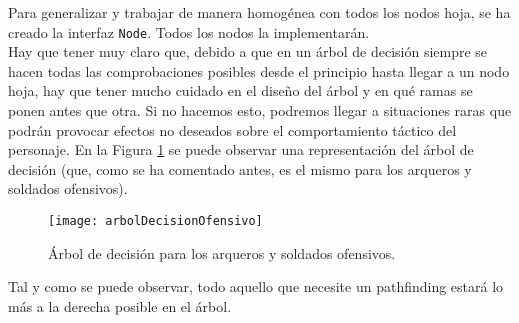 Para generalizar y trabajar de manera homogénea con todos los nodos hoja, se ha creado la interfaz \texttt{Node}. Todos los nodos la implementarán. \\

Hay que tener muy claro que, debido a que en un árbol de decisión siempre se hacen todas las comprobaciones posibles desde el principio hasta llegar a un nodo hoja, hay que tener mucho cuidado en el diseño del árbol y en qué ramas se ponen antes que otra. Si no hacemos esto, podremos llegar a situaciones raras que podrán provocar efectos no deseados sobre el comportamiento táctico del personaje. En la Figura \ref{ofensivos:ofensivos} se puede observar una representación del árbol de decisión (que, como se ha comentado antes, es el mismo para los arqueros y soldados ofensivos). \\

\begin{figure}[!th]
\texttt{[image: arbolDecisionOfensivo]}
\centering
\caption{Árbol de decisión para los arqueros y soldados ofensivos.}
\label{ofensivos:ofensivos}
\end{figure}

Tal y como se puede observar, todo aquello que necesite un pathfinding estará lo más a la derecha posible en el árbol.
